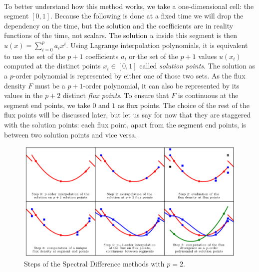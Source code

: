       \paragraph{}
      To better understand how this method works, we take a one-dimensional cell: the segment $\left[0, 1\right]$.
      Because the following is done at a fixed time we will drop the dependency on the time, but the solution and the coefficients are in reality functions of the time, not scalars.
      The solution $u$ inside this segment is then $u\left(x\right) = \sum_{i=0}^p a_ix^i$.
      Using Lagrange interpolation polynomials, it is equivalent to use the set of the $p + 1$ coefficients $a_i$ or the set of the $p + 1$ values $u\left(x_i\right)$ computed at the distinct points $x_i \in \left[0, 1\right]$ called \emph{solution points}.
      The solution as a $p$-order polynomial is represented by either one of those two sets.
      As the flux density $F$ must be a $p\!+\!1$-order polynomial, it can also be represented by its values in the $p + 2$ distinct \emph{flux points}.
      To ensure that $F$ is continuous at the segment end points, we take $0$ and $1$ as flux points.
      The choice of the rest of the flux points will be discussed later, but let us say for now that they are staggered with the solution points: each flux point, apart from the segment end points, is between two solution points and vice versa.

      \begin{figure}
        \centering
        \includegraphics{figures/sd_scheme.png}
        \caption{Steps of the Spectral Difference methods with $p = 2$.}
        \label{fig:sd_scheme}
      \end{figure}

